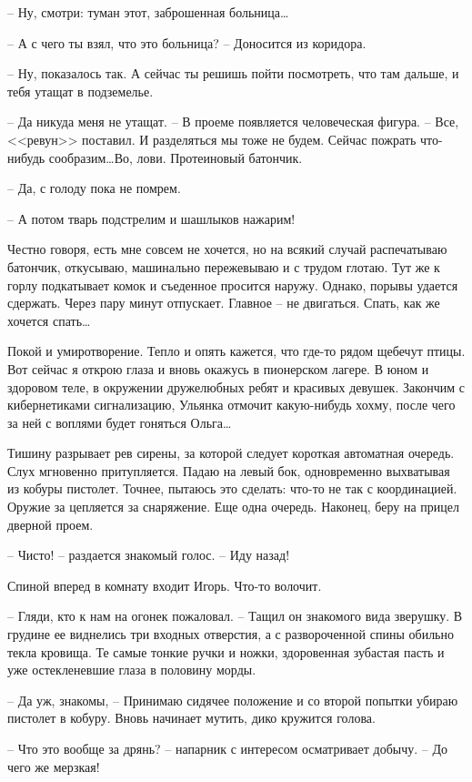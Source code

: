 \documentclass[a4paper]{book}
\begin{document}
-- Ну, смотри: туман этот, заброшенная больница\ldots

-- А с чего ты взял, что это больница? -- Доносится из коридора. 

-- Ну, показалось так. А сейчас ты решишь пойти посмотреть, что там дальше, и тебя утащат в подземелье. 

-- Да никуда меня не утащат. -- В проеме появляется человеческая фигура. -- Все, <<ревун>> поставил. И разделяться мы тоже не будем. Сейчас пожрать что-нибудь сообразим\ldots Во, лови. Протеиновый батончик. 

-- Да, с голоду пока не помрем.

-- А потом тварь подстрелим и шашлыков нажарим!

Честно говоря, есть мне совсем не хочется, но на всякий случай распечатываю батончик, откусываю, машинально пережевываю и с трудом глотаю. Тут же к горлу подкатывает комок и съеденное просится наружу. Однако, порывы удается сдержать. Через пару минут отпускает. Главное -- не двигаться. Спать, как же хочется спать\ldots

Покой и умиротворение. Тепло и опять кажется, что где-то рядом щебечут птицы. Вот сейчас я открою глаза и вновь окажусь в пионерском лагере. В юном и здоровом теле, в окружении дружелюбных ребят и красивых девушек. Закончим с кибернетиками сигнализацию, Ульянка отмочит какую-нибудь хохму, после чего за ней с воплями будет гоняться Ольга\ldots

Тишину разрывает рев сирены, за которой следует короткая автоматная очередь. Слух мгновенно притупляется. Падаю на левый бок, одновременно выхватывая из кобуры пистолет. Точнее, пытаюсь это сделать: что-то не так с координацией. Оружие за цепляется за снаряжение. Еще одна очередь. Наконец, беру на прицел дверной проем.

-- Чисто! -- раздается знакомый голос. -- Иду назад!

Спиной вперед в комнату входит Игорь. Что-то волочит. 

-- Гляди, кто к нам на огонек пожаловал. -- Тащил он знакомого вида зверушку. В грудине ее виднелись три входных отверстия, а с развороченной спины обильно текла кровища. Те самые тонкие ручки и ножки, здоровенная зубастая пасть и уже остекленевшие глаза в половину морды. 

-- Да уж, знакомы, -- Принимаю сидячее положение и со второй попытки убираю пистолет в кобуру. Вновь начинает мутить, дико кружится голова. 

-- Что это вообще за дрянь? -- напарник с интересом осматривает добычу. -- До чего же мерзкая!
\end{document}
